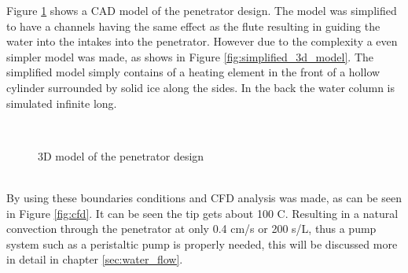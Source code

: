 Figure \ref{fig:3d_model} shows a CAD model of the penetrator design. The model was simplified to have a channels having the same effect as the flute resulting in guiding the water into the intakes into the penetrator. However due to the complexity a even simpler model was made, as shows in Figure \ref{fig:simplified_3d_model}. The simplified model simply contains of a heating element in the front of a hollow cylinder surrounded by solid ice along the sides. In the back the water column is simulated infinite long. %
\begin{figure}[htb]
	\centering
	\\
	\caption{3D model of the penetrator design}
	\label{fig:3d_model}
\end{figure}
\\
By using these boundaries conditions and CFD analysis was made, as can be seen in Figure \ref{fig:cfd}. It can be seen the tip gets about 100 \textdegree C. Resulting in a natural convection through the penetrator at only 0.4 cm/s or 200 s/L, thus a pump system such as a peristaltic pump is properly needed, this will be discussed more in detail in chapter \ref{sec:water_flow}.


